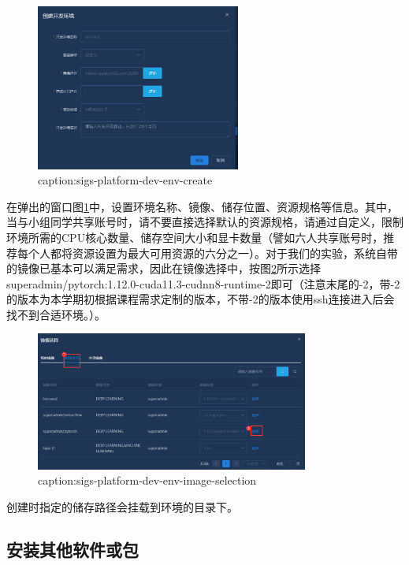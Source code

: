 \begin{figure}[htbp]
	\centering
	\includegraphics[width=0.6\textwidth]{figures/sigs-platform-dev-env-create.png}
	\caption{caption:sigs-platform-dev-env-create}
	\label{fig:sigs-platform-dev-env-create}
\end{figure}
在弹出的窗口图\ref{fig:sigs-platform-dev-env-create}中，设置环境名称、镜像、储存位置、资源规格等信息。其中，当与小组同学共享账号时，请不要直接选择默认的资源规格，请通过自定义，限制环境所需的CPU核心数量、储存空间大小和显卡数量（譬如六人共享账号时，推荐每个人都将资源设置为最大可用资源的六分之一）。对于我们的实验，系统自带的镜像已基本可以满足需求，因此在镜像选择中，按图\ref{fig:sigs-platform-dev-env-image-selection}所示选择superadmin/pytorch:1.12.0-cuda11.3-cudnn8-runtime-2即可（注意末尾的-2，带-2的版本为本学期初根据课程需求定制的版本，不带-2的版本使用ssh连接进入后会找不到合适环境。）。


\begin{figure}[htbp]
	\centering
	\includegraphics[width=0.8\textwidth]{figures/sigs-platform-dev-env-image-selection.png}
	\caption{caption:sigs-platform-dev-env-image-selection}
	\label{fig:sigs-platform-dev-env-image-selection}
\end{figure}

创建时指定的储存路径会挂载到环境的目录下。

\subsection{安装其他软件或包}

